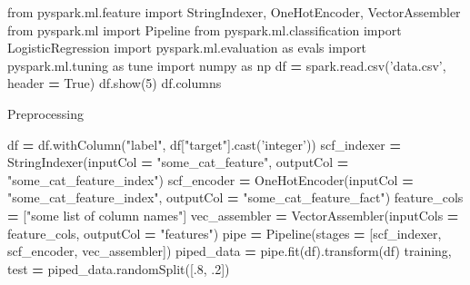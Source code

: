 \documentclass[]{book}
\newenvironment{Shaded}{\begin{snugshade}}{\end{snugshade}}
\newcommand{\DecValTok}[1]{\textcolor[rgb]{0.00,0.00,0.81}{#1}}
\newcommand{\StringTok}[1]{\textcolor[rgb]{0.31,0.60,0.02}{#1}}
\newcommand{\ImportTok}[1]{#1}
\newcommand{\VariableTok}[1]{\textcolor[rgb]{0.00,0.00,0.00}{#1}}
\newcommand{\OperatorTok}[1]{\textcolor[rgb]{0.81,0.36,0.00}{\textbf{#1}}}
\newcommand{\NormalTok}[1]{#1}
\begin{document}
\begin{Shaded}
\begin{Highlighting}[]
\ImportTok{from}\NormalTok{ pyspark.ml.feature }\ImportTok{import}\NormalTok{ StringIndexer, OneHotEncoder, VectorAssembler}
\ImportTok{from}\NormalTok{ pyspark.ml }\ImportTok{import}\NormalTok{ Pipeline}
\ImportTok{from}\NormalTok{ pyspark.ml.classification }\ImportTok{import}\NormalTok{ LogisticRegression}
\ImportTok{import}\NormalTok{ pyspark.ml.evaluation }\ImportTok{as}\NormalTok{ evals}
\ImportTok{import}\NormalTok{ pyspark.ml.tuning }\ImportTok{as}\NormalTok{ tune}
\ImportTok{import}\NormalTok{ numpy }\ImportTok{as}\NormalTok{ np}
\NormalTok{df }\OperatorTok{=}\NormalTok{ spark.read.csv(}\StringTok{'data.csv'}\NormalTok{, header }\OperatorTok{=} \VariableTok{True}\NormalTok{)}
\NormalTok{df.show(}\DecValTok{5}\NormalTok{)}
\NormalTok{df.columns}
\end{Highlighting}
\end{Shaded}

Preprocessing

\begin{Shaded}
\begin{Highlighting}[]
\NormalTok{df }\OperatorTok{=}\NormalTok{ df.withColumn(}\StringTok{"label"}\NormalTok{, df[}\StringTok{"target"}\NormalTok{].cast(}\StringTok{'integer'}\NormalTok{))}
\NormalTok{scf_indexer }\OperatorTok{=}\NormalTok{ StringIndexer(inputCol }\OperatorTok{=} \StringTok{"some_cat_feature"}\NormalTok{, outputCol }\OperatorTok{=} \StringTok{"some_cat_feature_index"}\NormalTok{)}
\NormalTok{scf_encoder }\OperatorTok{=}\NormalTok{ OneHotEncoder(inputCol }\OperatorTok{=} \StringTok{"some_cat_feature_index"}\NormalTok{, outputCol }\OperatorTok{=} \StringTok{"some_cat_feature_fact"}\NormalTok{)}
\NormalTok{feature_cols }\OperatorTok{=}\NormalTok{ [}\StringTok{"some list of column names"}\NormalTok{]}
\NormalTok{vec_assembler }\OperatorTok{=}\NormalTok{ VectorAssembler(inputCols }\OperatorTok{=}\NormalTok{ feature_cols, }
\NormalTok{                                outputCol }\OperatorTok{=} \StringTok{"features"}\NormalTok{)}
\NormalTok{pipe }\OperatorTok{=}\NormalTok{ Pipeline(stages }\OperatorTok{=}\NormalTok{ [scf_indexer, scf_encoder, vec_assembler])}
\NormalTok{piped_data }\OperatorTok{=}\NormalTok{ pipe.fit(df).transform(df)}
\NormalTok{training, test }\OperatorTok{=}\NormalTok{ piped_data.randomSplit([.}\DecValTok{8}\NormalTok{, .}\DecValTok{2}\NormalTok{])}
\end{Highlighting}
\end{Shaded}
\end{document}
